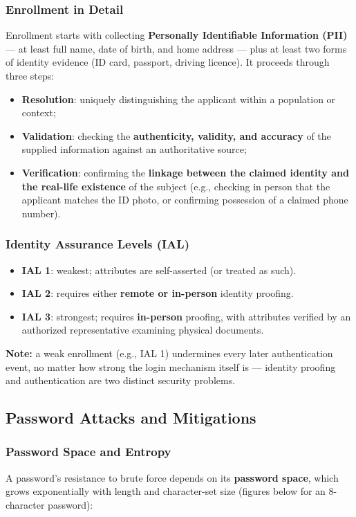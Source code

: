 \documentclass[12pt, a4paper]{article}
\begin{document}
\subsubsection{Enrollment in Detail}
Enrollment starts with collecting \textbf{Personally Identifiable Information (PII)} — at least full name, date of birth, and home address — plus at least two forms of identity evidence (ID card, passport, driving licence). It proceeds through three steps:
\begin{itemize}
    \item \textbf{Resolution}: uniquely distinguishing the applicant within a population or context;
    \item \textbf{Validation}: checking the \textbf{authenticity, validity, and accuracy} of the supplied information against an authoritative source;
    \item \textbf{Verification}: confirming the \textbf{linkage between the claimed identity and the real-life existence} of the subject (e.g., checking in person that the applicant matches the ID photo, or confirming possession of a claimed phone number).
\end{itemize}

\subsubsection{Identity Assurance Levels (IAL)}
\begin{itemize}
    \item \textbf{IAL 1}: weakest; attributes are self-asserted (or treated as such).
    \item \textbf{IAL 2}: requires either \textbf{remote or in-person} identity proofing.
    \item \textbf{IAL 3}: strongest; requires \textbf{in-person} proofing, with attributes verified by an authorized representative examining physical documents.
\end{itemize}

\textcolor{blue!50!black}{\textbf{Note:}} a weak enrollment (e.g., IAL 1) undermines every later authentication event, no matter how strong the login mechanism itself is — identity proofing and authentication are two distinct security problems.

\subsection{Password Attacks and Mitigations}

\subsubsection{Password Space and Entropy}
A password's resistance to brute force depends on its \textbf{password space}, which grows exponentially with length and character-set size (figures below for an 8-character password):
\end{document}
